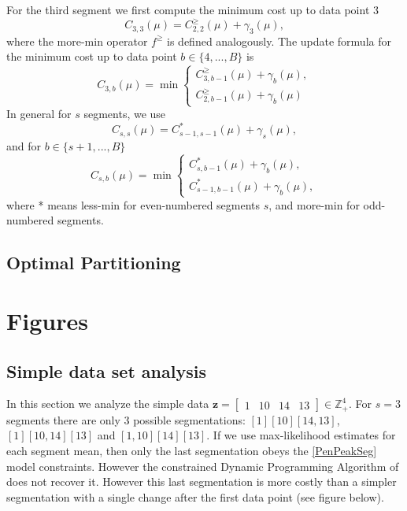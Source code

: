 \documentclass{article}
\newcommand{\ZZ}{\mathbb Z}
\begin{document}
For the third segment we first compute the minimum cost up to data point 3
\begin{equation*}
  C_{3,3}(\mu) = C_{2,2}^{\geq}(\mu) + \gamma_3(\mu),
\end{equation*}
where the more-min operator $f^\geq$ is defined analogously. The
update formula for the minimum cost up to data point
$b\in\{4, ..., B\}$ is
\begin{equation*}
  C_{3,b}(\mu) = \min
  \begin{cases}
    C_{3,b-1}^{\geq}(\mu)+\gamma_b(\mu),\\
    C_{2,b-1}^{\geq}(\mu)+\gamma_b(\mu)
  \end{cases}
\end{equation*}
In general for $s$ segments, we use
\begin{equation}
  C_{s,s}(\mu) = C_{s-1,s-1}^{*}(\mu) + \gamma_s(\mu),
\end{equation}
and for $b\in\{s+1, ..., B\}$
\begin{equation}
  C_{s,b}(\mu) = \min
  \begin{cases}
    C_{s,b-1}^{*}(\mu)+\gamma_b(\mu),\\
    C_{s-1,b-1}^{*}(\mu)+\gamma_b(\mu),
  \end{cases}
\end{equation}
where * means less-min for even-numbered segments $s$, and more-min
for odd-numbered segments.

\subsection{Optimal Partitioning}

\section{Figures}

\subsection{Simple data set analysis}

In this section we analyze the simple data
$\mathbf z = \left[\begin{array}{cccc} 1 & 10 & 14 & 13
\end{array}\right]\in\ZZ_+^4
$. For $s=3$ segments there are only 3 possible segmentations:
$[1][10][14, 13]$, $[1][10, 14][13]$ and $[1, 10][14][13]$. If we use
max-likelihood estimates for each segment mean, then only the last
segmentation obeys the \ref{PenPeakSeg} model constraints. However the
constrained Dynamic Programming Algorithm of \citet{PeakSeg} does not
recover it. However this last segmentation is more costly than a
simpler segmentation with a single change after the first data point
(see figure below).
\end{document}

